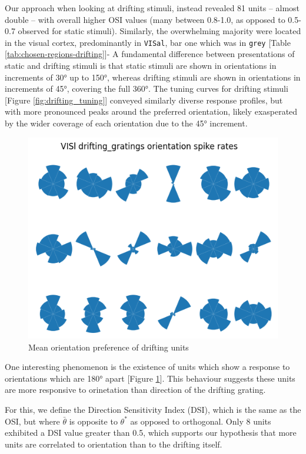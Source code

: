 \documentclass[10pt,twocolumn]{article}
\begin{document}
Our approach when looking at drifting stimuli, instead revealed 81 units -- almost double -- with overall higher OSI values (many between 0.8-1.0, as opposed to 0.5-0.7 observed for static stimuli). Similarly, the overwhelming majority were located in the visual cortex, predominantly in \texttt{VISal}, bar one which was in \texttt{grey} [Table \ref{tab:chosen-regions-drifting}]- A fundamental difference between presentations of static and drifting stimuli is that static stimuli are shown in orientations in increments of 30° up to 150°, whereas drifting stimuli are shown in orientations in increments of 45°, covering the full 360°. The tuning curves for drifting stimuli [Figure \ref{fig:drifting_tuning}] conveyed similarly diverse response profiles, but with more pronounced peaks around the preferred orientation, likely exasperated by the wider coverage of each orientation due to the 45° increment.

\begin{figure}[h]
  \centering
  \includegraphics[width=0.6\linewidth]{report_images/drifting_unit_mean_orientation.png}
  \caption{Mean orientation preference of drifting units}
  \label{fig:drifting_unit_mean_orientation}
\end{figure}

One interesting phenomenon is the existence of units which show a response to orientations which are 180° apart [Figure \ref{fig:drifting_unit_mean_orientation}].  This behaviour suggests these units are more responsive to orinetation than direction of the drifting grating.

For this, we define the Direction Sensitivity Index (DSI), which is the same as the OSI, but where \(\bar\theta\) is opposite to \(\theta^*\) as opposed to orthogonal.  Only 8 units exhibited a DSI value greater than 0.5, which supports our hypothesis that more units are correlated to orientation than to the drifting itself.
\end{document}
